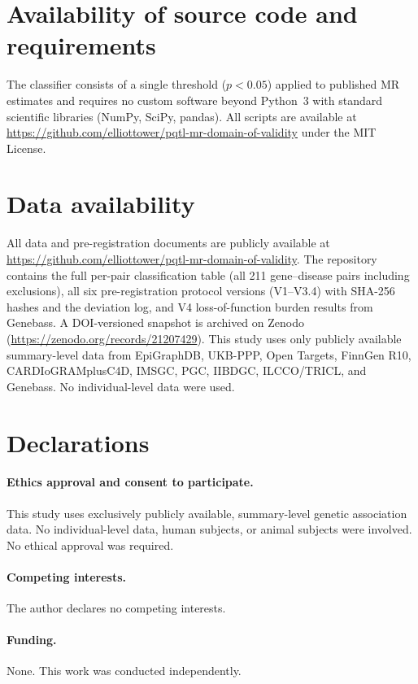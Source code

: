 \documentclass[11pt]{article}
\begin{document}
\section*{Availability of source code and requirements}

The classifier consists of a single threshold ($p < 0.05$) applied to published MR estimates and requires no custom software beyond Python~3 with standard scientific libraries (NumPy, SciPy, pandas). All scripts are available at \url{https://github.com/elliottower/pqtl-mr-domain-of-validity} under the MIT License.

\section*{Data availability}

All data and pre-registration documents are publicly available at \url{https://github.com/elliottower/pqtl-mr-domain-of-validity}. The repository contains the full per-pair classification table (all 211 gene--disease pairs including exclusions), all six pre-registration protocol versions (V1--V3.4) with SHA-256 hashes and the deviation log, and V4 loss-of-function burden results from Genebass. A DOI-versioned snapshot is archived on Zenodo (\url{https://zenodo.org/records/21207429}). This study uses only publicly available summary-level data from EpiGraphDB, UKB-PPP, Open Targets, FinnGen R10, CARDIoGRAMplusC4D, IMSGC, PGC, IIBDGC, ILCCO/TRICL, and Genebass. No individual-level data were used.

\section*{Declarations}

\paragraph{Ethics approval and consent to participate.}
This study uses exclusively publicly available, summary-level genetic association data. No individual-level data, human subjects, or animal subjects were involved. No ethical approval was required.

\paragraph{Competing interests.}
The author declares no competing interests.

\paragraph{Funding.}
None. This work was conducted independently.
\end{document}
